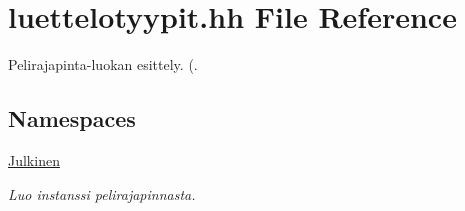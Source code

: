 \hypertarget{luettelotyypit_8hh}{}\section{luettelotyypit.\+hh File Reference}
\label{luettelotyypit_8hh}


Pelirajapinta-\/luokan esittely. (.  


\subsection*{Namespaces}
\begin{DoxyCompactItemize}
\item 
 \hyperlink{namespace_julkinen}{Julkinen}
\begin{DoxyCompactList}\small\item\em Luo instanssi pelirajapinnasta. \end{DoxyCompactList}\end{DoxyCompactItemize}
